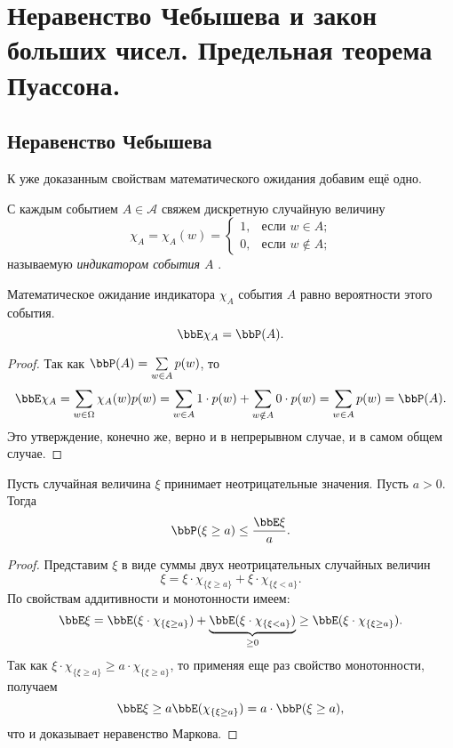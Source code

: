 \chapter{Неравенство Чебышева и закон больших чисел. Предельная теорема Пуассона.}
\section{Неравенство Чебышева}

К уже доказанным свойствам математического ожидания добавим ещё одно.
\begin{defn}
С каждым событием $A \in \mathcal{A}$ свяжем дискретную случайную величину
$$
\chi_A =\chi_A(w)=\begin{cases}
1,&\text{если $w \in A$;}\\
0,&\text{если $w \notin A$;}
\end{cases}
$$
называемую \textit{индикатором события $A$} .
\end{defn}
\begin{thm}
Математическое ожидание индикатора $\chi_A$ события $A$ равно вероятности этого события.
$$
\bbE\chi_A=\bbP(A).
$$ 
\end{thm}
\begin{proof}
Так как $\bbP(A)=\sum\limits_{w\in A}p(w)$, то 
$$
\bbE\chi_A=\sum\limits_{w\in\Omega}\chi_A(w)p(w)=\sum\limits_{w\in A}1\cdot p(w)+\sum\limits_{w\notin A}0\cdot p(w)=\sum\limits_{w\in A}p(w)=\bbP(A).
$$
Это утверждение, конечно же, верно и в непрерывном случае, и в самом общем случае.
\end{proof}

\begin{thm}
Пусть случайная величина $\xi$ принимает неотрицательные значения. Пусть $a>0$. Тогда 
$$
\bbP(\xi \ge a)\le\frac{\bbE\xi}{a}.
$$
\end{thm}
\begin{proof}
Представим $\xi$ в виде суммы двух неотрицательных случайных величин
$$
\xi = \xi\cdot\chi_{\{\xi\ge a\}}+\xi\cdot\chi_{\{\xi< a\}}.
$$
По свойствам аддитивности и монотонности имеем:
$$
\bbE \xi=\bbE (\xi\cdot\chi_{\{\xi\ge a\}})+\underbrace{\bbE (\xi\cdot\chi_{\{\xi< a\}})}_{\ge 0} \ge \bbE (\xi\cdot\chi_{\{\xi\ge a\}}).
$$
Так как $\xi\cdot\chi_{\{\xi\ge a\}}\ge a\cdot\chi_{\{\xi\ge a\}}$, то применяя еще раз свойство монотонности, получаем
$$
\bbE \xi\ge a\bbE (\chi_{\{\xi\ge a\}})=a\cdot \bbP(\xi\ge a),
$$
что и доказывает неравенство Маркова.
\end{proof}

